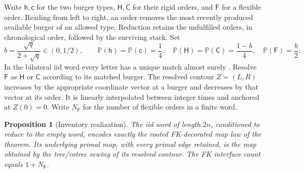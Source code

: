 \documentclass[11pt]{article}
\numberwithin{equation}{section}
\newtheorem{proposition}[theorem]{Proposition}
\theoremstyle{definition}
\theoremstyle{remark}
\newcommand{\1}{\mathbf 1}
\begin{document}
Write $\mathsf h,\mathsf c$ for the two burger types,
$\mathsf H,\mathsf C$ for their rigid orders, and $\mathsf F$ for a flexible
order.  Reading from left to right, an order removes the most recently
produced available burger of an allowed type.  Reduction retains the
unfulfilled orders, in chronological order, followed by the surviving stack.
Set
\begin{equation}\label{enc:letter-law}
 b=\frac{\sqrt q}{2+\sqrt q}\in(0,1/2),\qquad
 \mathbb P(\mathsf h)=\mathbb P(\mathsf c)=\frac14,\quad
 \mathbb P(\mathsf H)=\mathbb P(\mathsf C)=\frac{1-b}{4},\quad
 \mathbb P(\mathsf F)=\frac b2.
\end{equation}
In the bilateral iid word every letter has a unique match almost surely
\cite[Proposition 2.2]{SheffieldInventory}.  Resolve $\mathsf F$ as
$\mathsf H$ or $\mathsf C$ according to its matched burger.  The resolved
contour $Z=(L,R)$ increases by the appropriate coordinate vector at a burger
and decreases by that vector at its order.  It is linearly interpolated
between integer times and anchored at $Z(0)=0$.  Write $N_{\mathsf F}$
for the number of flexible orders in a finite word.

\begin{proposition}[Inventory realization]\label{enc:inventory-law}
The iid word of length $2n$, conditioned to reduce to the empty word,
encodes exactly the rooted FK-decorated map law of the theorem.  Its
underlying primal map, with every primal edge retained, is the map obtained
by the tree/cotree sewing of its resolved contour.  The FK interface count
equals $1+N_{\mathsf F}$.
\end{proposition}
\end{document}
